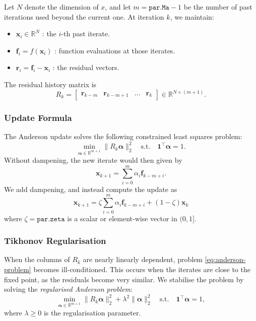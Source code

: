 \documentclass[a4paper,12pt]{article}
\begin{document}
Let $N$ denote the dimension of $x$, and let $m = \texttt{par.Ma} - 1$ be the number of past iterations used beyond the current one.  
At iteration $k$, we maintain:
\begin{itemize}
    \item $\mathbf{x}_i \in \mathbb{R}^N$ : the $i$-th past iterate.
    \item $\mathbf{f}_i = f(\mathbf{x}_i)$ : function evaluations at those iterates.
    \item $\mathbf{r}_i = \mathbf{f}_i - \mathbf{x}_i$ : the residual vectors.
\end{itemize}

The residual history matrix is
\[
    R_k = \begin{bmatrix}
    \mathbf{r}_{k-m} & \mathbf{r}_{k-m+1} & \dots & \mathbf{r}_k
    \end{bmatrix} \in \mathbb{R}^{N \times (m+1)}.
\]

\subsubsection{Update Formula}
The Anderson update solves the following constrained least squares problem:
\begin{equation}
\label{eq:anderson-problem}
    \min_{\boldsymbol{\alpha} \in \mathbb{R}^{m+1}} \| R_k \boldsymbol{\alpha} \|_2^2 
    \quad \text{s.t.} \quad \mathbf{1}^\top \boldsymbol{\alpha} = 1.
\end{equation}
Without dampening, the new iterate would then given by
\begin{equation}
\label{eq:anderson-update}
    \mathbf{x}_{k+1} = \sum_{i=0}^m \alpha_i \mathbf{f}_{k-m+i}.
\end{equation}
We add dampening, and instead compute the update as
\begin{equation}
\label{eq:anderson-update2}
    \mathbf{x}_{k+1} = \zeta \sum_{i=0}^m \alpha_i \mathbf{f}_{k-m+i} + (1-\zeta) \mathbf{x}_{k}
\end{equation}
where $\zeta = \texttt{par.zeta}$ is a scalar or element-wise vector in $(0,1]$.

\subsubsection{Tikhonov Regularisation}
When the columns of $R_k$ are nearly linearly dependent, problem \eqref{eq:anderson-problem} becomes ill-conditioned.  
This occurs when the iterates are close to the fixed point, as the residuals become very similar.  
We stabilise the problem by solving the \emph{regularised Anderson problem}:
\begin{equation}
\label{eq:anderson-regularised}
    \min_{\boldsymbol{\alpha} \in \mathbb{R}^{m+1}} \| R_k \boldsymbol{\alpha} \|_2^2 
    + \lambda^2 \| \boldsymbol{\alpha} \|_2^2 
    \quad \text{s.t.} \quad \mathbf{1}^\top \boldsymbol{\alpha} = 1,
\end{equation}
where $\lambda \ge 0$ is the regularisation parameter.
\end{document}
